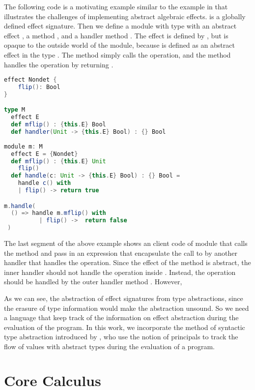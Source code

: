 The following code is a motivating example similar to the example in \cite{biernacki19} that illustrates the challenges of implementing abstract algebraic effects.  is a globally defined effect signature. Then we define a module  with type  with an abstract effect , a method , and a handler method . The effect  is defined by , but is opaque to the outside world of the module, because  is defined as an abstract effect in the type . The method  simply calls the  operation, and the  method handles the  operation by returning . 

\begin{lstlisting}[language=scala]  
effect Nondet {
    flip(): Bool  
}

type M
  effect E 
  def mflip() : {this.E} Bool
  def handler(Unit -> {this.E} Bool) : {} Bool
  
module m: M
  effect E = {Nondet}
  def mflip() : {this.E} Unit
    flip()
  def handle(c: Unit -> {this.E} Bool) : {} Bool = 
    handle c() with
    | flip() -> return true

m.handle(
  () => handle m.mflip() with
          | flip() ->  return false
 )

\end{lstlisting}

The last segment of the above example shows an client code of module  that calls the method  and pass in an expression that encapsulate the call to  by another handler that handles the  operation. Since the effect of the method  is abstract, the inner handler should not handle the operation inside . Instead, the operation should be handled by the outer handler method . However, 

As we can see, the abstraction of effect signatures from type abstractions, since the erasure of type information would make the abstraction unsound. So we need a language that keep track of the information on effect abstraction during the evaluation of the program. In this work, we incorporate the method of syntactic type abstraction introduced by \citet{grossman00}, who use the notion of principals to track the flow of values with abstract types during the evaluation of a program. 

\section{Core Calculus}
\label{sec-core}
